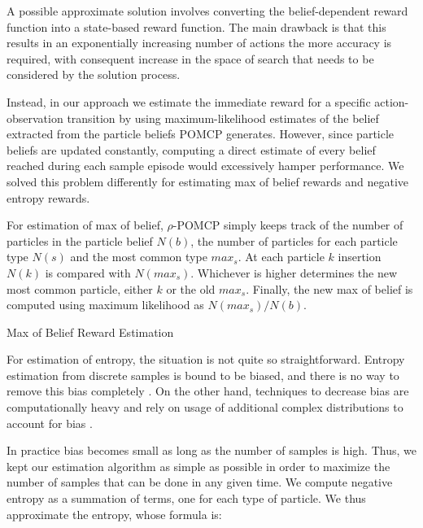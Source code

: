 A possible approximate solution involves converting the belief-dependent reward function into a
state-based reward function. The main drawback is that this results in an exponentially increasing
number of actions the more accuracy is required, with consequent increase in the space of search
that needs to be considered by the solution process.

Instead, in our approach we estimate the immediate reward for a specific action-observation
transition by using maximum-likelihood estimates of the belief extracted from the particle beliefs
POMCP generates. However, since particle beliefs are updated constantly, computing a direct estimate
of every belief reached during each sample episode would excessively hamper performance. We solved
this problem differently for estimating max of belief rewards and negative entropy rewards.

For estimation of max of belief, $\rho$-POMCP simply keeps track of the number of particles in the
particle belief $N(b)$, the number of particles for each particle type $N(s)$ and the most common
type $max_s$. At each particle $k$ insertion $N(k)$ is compared with $N(max_s)$. Whichever is higher
determines the new most common particle, either $k$ or the old $max_s$. Finally, the new max of
belief is computed using maximum likelihood as $N(max_s)/N(b)$.

\begin{algorithm}[H]
    \caption{Max of Belief Reward Estimation}

\end{algorithm}

For estimation of entropy, the situation is not quite so straightforward. Entropy estimation from
discrete samples is bound to be biased, and there is no way to remove this bias completely
\cite{cit:badentropy}. On the other hand, techniques to decrease bias are computationally heavy and
rely on usage of additional complex distributions to account for bias \cite{cit:entropyfixes}.

In practice bias becomes small as long as the number of samples is high. Thus, we kept our
estimation algorithm as simple as possible in order to maximize the number of samples that can be
done in any given time. We compute negative entropy as a summation of terms, one for each type of
particle. We thus approximate the entropy, whose formula is:

